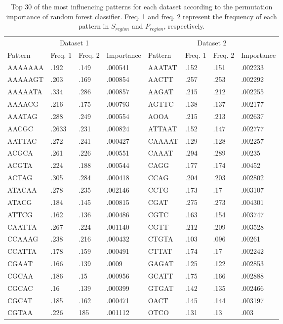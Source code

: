 \documentclass{article}
\begin{document}
\begin{table}[h]
 \caption{Top 30 of the most influencing patterns for each dataset according to the permutation importance of random forest classifier. Freq. 1 and freq. 2 represent the frequency of each pattern in $S_{region}$ and $P_{region}$, respectively. }
  \centering
  \begin{tabular}{llll|llll}
    \toprule
    \multicolumn{4}{c|}{Dataset 1}& \multicolumn{4}{c}{Dataset 2} \\
    Pattern&Freq. 1&Freq. 2& Importance&Pattern&Freq. 1&Freq. 2& Importance\\ 
    \midrule
    AAAAAAA&.192&.149&.000541&AAATAT&.152&.151&.002233\\
    AAAAAGT&.203&.169&.000854&AACTT&.257&.253&.002292\\
    AAAAATA&.334&.286&.000857&AAGAT&.215&.212&.002255\\
    AAAACG&.216&.175&.000793&AGTTC&.138&.137&.002177\\
    AAATAG&.288&.249&.000554&AOOA&.215&.213&.002637\\
    AACGC&.2633&.231&.000824&ATTAAT&.152&.147&.002777\\
    AATTAC&.272&.241&.000427&CAAAAT&.129&.128&.002257\\
    ACGCA&.261&.226&.000551&CAAAT&.294&.289&.00235\\
    ACGTA&.224&.188&.000544&CAGG&.177&.174&.00452\\
    ACTAG&.305&.284&.000418&CCAG&.204&.203&.002802\\
    ATACAA&.278&.235&.002146&CCTG&.173&.17&.003107\\
    ATACG&.184&.145&.000815&CGAT&.275&.273&.004301\\
    ATTCG&.162&.136&.000486&CGTC&.163&.154&.003747\\
    CAATTA&.267&.224&.001140&CGTT&.212&.209&.003528\\
    CCAAAG&.238&.216&.000432&CTGTA&.103&.096&.00261\\
    CCATTA&.178&.159&.000491&CTTAT&.174&.17&.002242\\
    CGAAT&.166&.139&.0009&GAGAT&.125&.122&.002853\\
    CGCAA&.186&.15&.000956&GCATT&.175&.166&.002888\\
    CGCAC&.16&.139&.000399&GTGAT&.142&.135&.002466\\
    CGCAT&.185&.162&.000471&OACT&.145&.144&.003197\\
    CGTAA&.226&185&.001112&OTCO&.131&.13&.003\\

\end{tabular}
\end{table}
\end{document}
